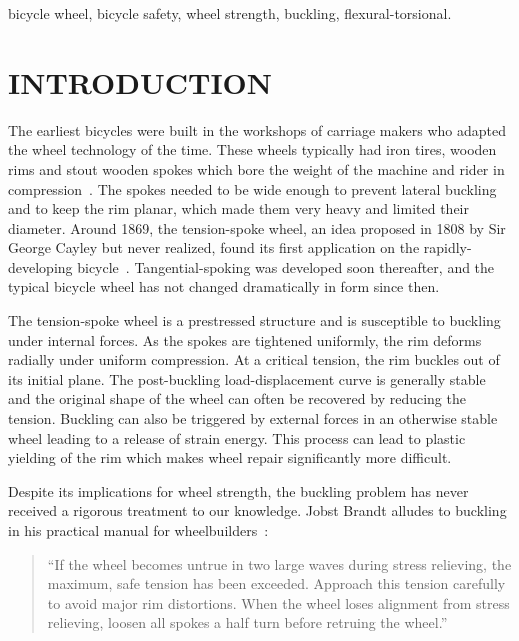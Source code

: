 \documentclass{bmd2016p}
\begin{document}
\begin{keywords}
bicycle wheel, 
bicycle safety, 
wheel strength, 
buckling, 
flexural-torsional.
\end{keywords}



\section{INTRODUCTION}
The earliest bicycles were built in the workshops of carriage makers who adapted the wheel technology of the time. These wheels typically had iron tires, wooden rims and stout wooden spokes which bore the weight of the machine and rider in compression~\cite{Herlihy2004a}. The spokes needed to be wide enough to prevent lateral buckling and to keep the rim planar, which made them very heavy and limited their diameter. Around 1869, the tension-spoke wheel, an idea proposed in 1808 by Sir George Cayley but never realized, found its first application on the rapidly-developing bicycle~\cite{Ackroyd2011a,Clayton1991b}. Tangential-spoking was developed soon thereafter, and the typical bicycle wheel has not changed dramatically in form since then.

The tension-spoke wheel is a prestressed structure and is susceptible to buckling under internal forces. As the spokes are tightened uniformly, the rim deforms radially under uniform compression. At a critical tension, the rim buckles out of its initial plane. The post-buckling load-displacement curve is generally stable and the original shape of the wheel can often be recovered by reducing the tension. Buckling can also be triggered by external forces in an otherwise stable wheel leading to a release of strain energy. This process can lead to plastic yielding of the rim which makes wheel repair significantly more difficult.

Despite its implications for wheel strength, the buckling problem has never received a rigorous treatment to our knowledge. Jobst Brandt alludes to buckling in his practical manual for wheelbuilders~\cite{Brandt1993c}:

\begin{quotation}
\noindent``If the wheel becomes untrue in two large waves during stress relieving, the maximum, safe tension has been exceeded. Approach this tension carefully to avoid major rim distortions. When the wheel loses alignment from stress relieving, loosen all spokes a half turn before retruing the wheel.''
\end{quotation}
\end{document}
